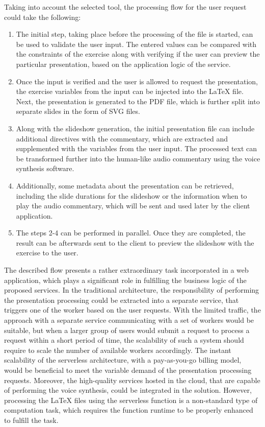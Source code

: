 Taking into account the selected tool, the processing flow for the user request could take the following:

\begin{enumerate}
   \item The initial step, taking place before the processing of the file is started, can be used to validate the user input. The entered values can be compared with the constraints of the exercise along with verifying if the user can preview the particular presentation, based on the application logic of the service.
   \item Once the input is verified and the user is allowed to request the presentation, the exercise variables from the input can be injected into the LaTeX file. 
   Next, the presentation is generated to the PDF file, which is further split into separate slides in the form of SVG files.
   \item Along with the slideshow generation, the initial presentation file can include additional directives with the commentary, which are extracted and supplemented with the variables from the user input. The processed text can be transformed further into the human-like audio commentary using the voice synthesis software.
   \item Additionally, some metadata about the presentation can be retrieved, including the slide durations for the slideshow or the information when to play the audio commentary, which will be sent and used later by the client application.
   \item The steps 2-4 can be performed in parallel. Once they are completed, the result can be afterwards sent to the client to preview the slideshow with the exercise to the user.
\end{enumerate}

The described flow presents a rather extraordinary task incorporated in a web application, which plays a significant role in fulfilling the business logic of the proposed services.
In the traditional architecture, the responsibility of performing the presentation processing could be extracted into a separate service, that triggers one of the worker based on the user requests.
With the limited traffic, the approach with a separate service communicating with a set of workers would be suitable, but when a larger group of users would submit a request to process a request within a short period of time, the scalability of such a system should require to scale the number of available workers accordingly.
The instant scalability of the serverless architecture, with a pay-as-you-go billing model, would be beneficial to meet the variable demand of the presentation processing requests.
Moreover, the high-quality services hosted in the cloud, that are capable of performing the voice synthesis, could be integrated in the solution.
However, processing the LaTeX files using the serverless function is a non-standard type of computation task, which requires the function runtime to be properly enhanced to fulfill the task.

